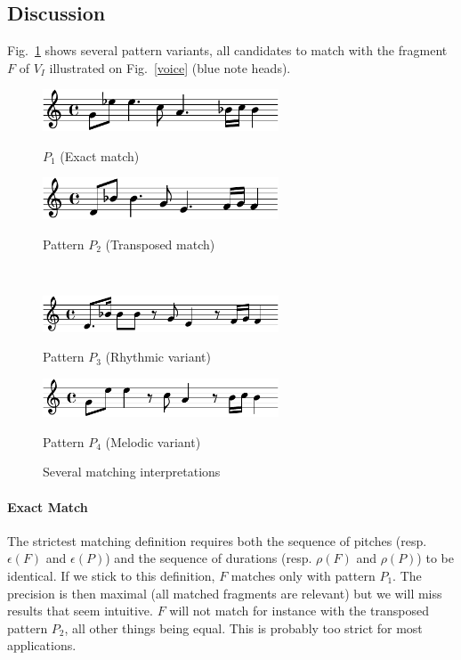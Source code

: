 \documentclass[letterpaper, 11pt]{article}
\begin{document}
\subsection{Discussion}

Fig.~\ref{patterns} shows several pattern variants, all candidates to match with 
the fragment $F$ of $V_I$ illustrated on Fig.~\ref{voice} (blue note heads).

\begin{figure}[th]
\begin{center}
\begin{minipage}[b]{7cm}
\includegraphics[width=7cm]{../score-examples/pexact}
\centerline{$P_1$ (Exact match)}
\end{minipage}  \hspace*{0.5cm}
\begin{minipage}[b]{7cm}
\includegraphics[width=7cm]{../score-examples/ptransposed}
\centerline{Pattern $P_2$ (Transposed match)}
\end{minipage} \\
\begin{minipage}[b]{7cm}
\includegraphics[width=7cm]{../score-examples//psmallrhythmvariant}
\centerline{Pattern $P_3$ (Rhythmic variant)}
\end{minipage}  \hspace*{0.5cm}
\begin{minipage}[b]{7cm}
\includegraphics[width=7cm]{../score-examples//pexact3}
\centerline{Pattern $P_4$ (Melodic variant)}
\end{minipage} 
\end{center}
\caption{\label{patterns} Several matching interpretations }
\end{figure}

\paragraph{Exact Match}
The strictest matching definition requires  both 
the sequence of pitches 
(resp. $\epsilon(F)$ and $\epsilon(P)$) and the sequence of durations (resp. $\rho(F)$ and $\rho(P)$)
to be identical.  
If we stick to this definition, $F$ matches only with pattern $P_1$. The precision is 
then maximal (all matched fragments are relevant)  but we will miss 
results that seem intuitive. $F$ will not match for instance 
with the transposed pattern $P_2$, all other things being equal. This is probably too strict 
for most applications.
\end{document}
